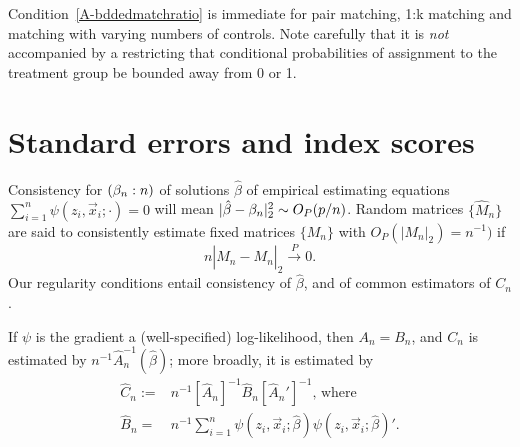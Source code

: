 \documentclass{article}
\theoremstyle{remark}
\begin{document}
Condition~\ref{A-bddedmatchratio} is immediate for pair matching, 1:k matching and matching with varying numbers of controls.  Note carefully that it is \textit{not} accompanied by a restricting that conditional probabilities of assignment to the treatment group be bounded away from 0 or 1. 

\section{Standard errors and index scores}

Consistency for $(\beta_{n }: n)$ of solutions $\hat{\beta}$ of empirical estimating equations $\sum_{i=1}^{n}\psi(z_{i}, \vec{x}_{i}; \cdot) = 0 $ will mean  $|\hat\beta - \beta_{n }|_{2}^{2} \sim O_{P}(p/n)$.
Random matrices $\{ \hat{M}_{n} \}$ are said to consistently estimate fixed matrices $\{M_{n}\}$ with $O_{P}(|M_{n}|_{2}) = n^{-1})$ if
$$n|\hat{M}_{n} - {M}_{n}|_{2} \stackrel{P}{\rightarrow} 0.$$
Our regularity conditions entail consistency of $\hat\beta$, and of common estimators of $C_{n}$.  

If $\psi$ is the gradient a (well-specified) log-likelihood, then $A_{n}=B_{n}$, and $C_{n}$ is estimated by $n^{-1}\hat{A}_{n}^{-1}(\hat\beta)$; more broadly, it is estimated by 
\begin{align*}
\hat{C}_{n} :=& n^{-1} [\hat{A}_{n}]^{-1} \hat{B}_{n} [\hat{A}_{n}']^{-1},\, \text{where}\\
\hat{B}_{n}  =&  n^{-1} \sum_{i=1}^{n} \psi(z_{i}, \vec{x}_{i};  \hat{\beta} ) \psi(z_{i}, \vec{x}_{i};  \hat{\beta} )'.  
\end{align*}
\end{document}
